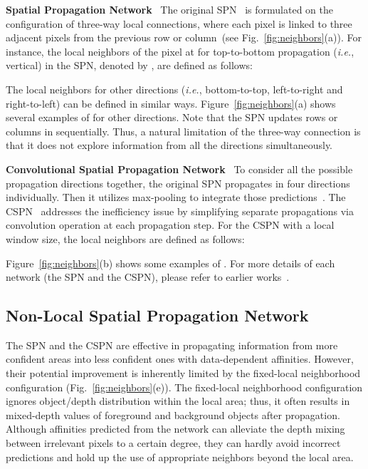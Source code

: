 \documentclass[runningheads]{llncs}
\newcommand{\figref}[1]{Fig.~\ref{#1}}
\newcommand{\Figref}[1]{Figure~\ref{#1}}
\newcommand{\ie}{\textit{i.e.}}
\begin{document}
\noindent\textbf{Spatial Propagation Network} \ 
The original SPN~\cite{liu2017learning} is formulated on the configuration of three-way local connections, where each pixel is linked to three adjacent pixels from the previous row or column~(see \figref{fig:neighbors}(a)). 
For instance, the local neighbors of the pixel at  for top-to-bottom propagation (\ie, vertical) in the SPN, denoted by , are defined as follows: 

The local neighbors for other directions (\textit{i.e.}, bottom-to-top, left-to-right and right-to-left) can be defined in similar ways. 
\Figref{fig:neighbors}(a) shows several examples of  for other directions. 
Note that the SPN updates rows or columns in  sequentially. 
Thus, a natural limitation of the three-way connection is that it does not explore information from all the directions simultaneously.


\noindent\textbf{Convolutional Spatial Propagation Network} \ 
To consider all the possible propagation directions together, the original SPN propagates in four directions individually. 
Then it utilizes max-pooling to integrate those predictions~\cite{liu2017learning}. 
The CSPN~\cite{cheng2018depth} addresses the inefficiency issue by simplifying separate propagations via convolution operation at each propagation step. 
For the CSPN with a  local window size, the local neighbors  are defined as follows: 

\Figref{fig:neighbors}(b) shows some examples of . 
For more details of each network (the SPN and the CSPN), please refer to earlier works~\cite{liu2017learning,cheng2018depth}.


\subsection{Non-Local Spatial Propagation Network}
\label{subsec:nlspn}

The SPN and the CSPN are effective in propagating information from more confident areas into less confident ones with data-dependent affinities. 
However, their potential improvement is inherently limited by the fixed-local neighborhood configuration (\figref{fig:neighbors}(e)).
The fixed-local neighborhood configuration ignores object/depth distribution within the local area; thus, it often results in mixed-depth values of foreground and background objects after propagation. 
Although affinities predicted from the network can alleviate the depth mixing between irrelevant pixels to a certain degree, they can hardly avoid incorrect predictions and hold up the use of appropriate neighbors beyond the local area.
\end{document}
